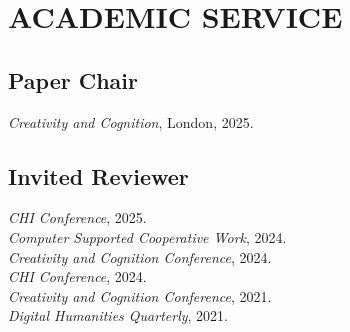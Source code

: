  \section{ACADEMIC SERVICE}

 \subsection{Paper Chair}
  \emph{Creativity and Cognition}, London, 2025.\\
 
  \subsection{Invited Reviewer}
     \emph{CHI Conference}, 2025. \\
     \emph{Computer Supported Cooperative Work}, 2024. \\
     \emph{Creativity and Cognition Conference}, 2024. \\
   \emph{CHI Conference}, 2024. \\
 \emph{Creativity and Cognition Conference}, 2021. \\
  \emph{Digital Humanities Quarterly}, 2021. \\
 